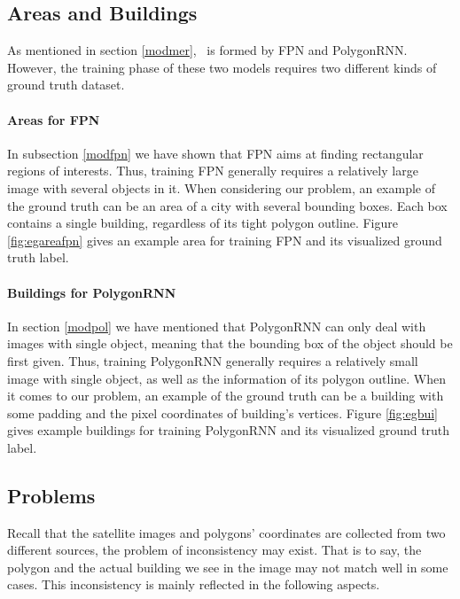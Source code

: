 \subsection{Areas and Buildings}\label{arebui}

As mentioned in section \ref{modmer}, \modelnameshort\ is formed by FPN and PolygonRNN. However, the training phase of these two models requires two different kinds of ground truth dataset.

\paragraph{Areas for FPN}
In subsection \ref{modfpn} we have shown that FPN aims at finding rectangular regions of interests. Thus, training FPN generally requires a relatively large image with several objects in it. When considering our problem, an example of the ground truth can be an area of a city with several bounding boxes. Each box contains a single building, regardless of its tight polygon outline. Figure \ref{fig:egareafpn} gives an example area for training FPN and its visualized ground truth label.



\paragraph{Buildings for PolygonRNN}
In section \ref{modpol} we have mentioned that PolygonRNN can only deal with images with single object, meaning that the bounding box of the object should be first given. Thus, training PolygonRNN generally requires a relatively small image with single object, as well as the information of its polygon outline. When it comes to our problem, an example of the ground truth can be a building with some padding and the pixel coordinates of building's vertices. Figure \ref{fig:egbui} gives example buildings for training PolygonRNN and its visualized ground truth label.



\subsection{Problems}\label{proble}

Recall that the satellite images and polygons' coordinates are collected from two different sources, the problem of inconsistency may exist. That is to say, the polygon and the actual building we see in the image may not match well in some cases. This inconsistency is mainly reflected in the following aspects.

